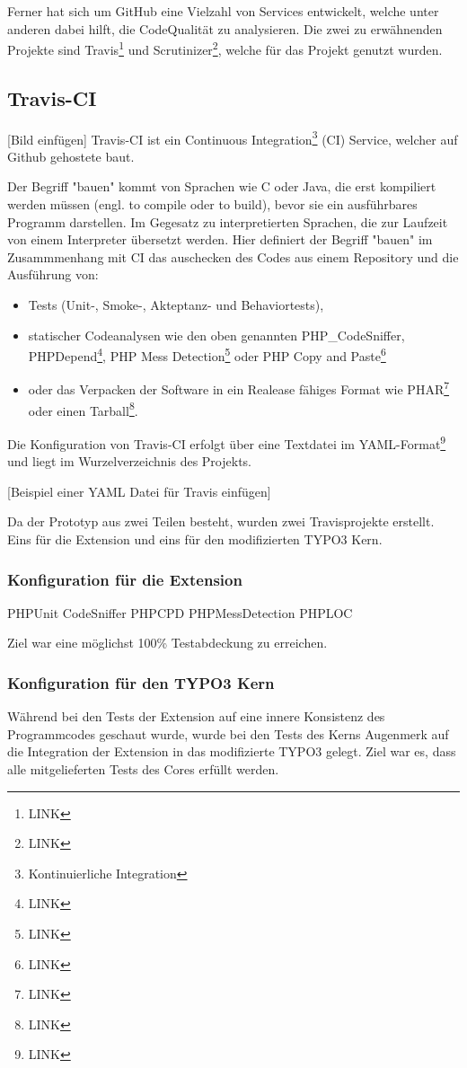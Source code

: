 Ferner hat sich um GitHub eine Vielzahl von Services entwickelt, welche unter anderen dabei hilft, die CodeQualität zu analysieren. Die zwei zu erwähnenden Projekte sind Travis\footnote{LINK} und Scrutinizer\footnote{LINK}, welche für das Projekt genutzt wurden.

\subsection{Travis-CI}
[Bild einfügen]
Travis-CI ist ein Continuous Integration\footnote{Kontinuierliche Integration} (CI) Service, welcher auf Github gehostete baut.

Der Begriff "bauen" kommt von Sprachen wie C oder Java, die erst kompiliert werden müssen (engl. to compile oder to build), bevor sie ein ausführbares Programm darstellen. Im Gegesatz zu interpretierten Sprachen, die zur Laufzeit von einem Interpreter übersetzt werden. Hier definiert der Begriff "bauen" im Zusammmenhang mit CI das auschecken des Codes aus einem Repository und die Ausführung von:
	\begin{itemize}
		\item Tests (Unit-, Smoke-, Akteptanz- und Behaviortests),
		\item statischer Codeanalysen wie den oben genannten PHP\_CodeSniffer, PHPDepend\footnote{LINK}, PHP Mess Detection\footnote{LINK} oder PHP Copy and Paste\footnote{LINK}
		\item oder das Verpacken der Software in ein Realease fähiges Format wie PHAR\footnote{LINK} oder einen Tarball\footnote{LINK}.
	\end{itemize}

Die Konfiguration von Travis-CI erfolgt über eine Textdatei im YAML-Format\footnote{LINK} und liegt im Wurzelverzeichnis des Projekts.

[Beispiel einer YAML Datei für Travis einfügen]

Da der Prototyp aus zwei Teilen besteht, wurden zwei Travisprojekte erstellt. Eins für die Extension und eins für den modifizierten TYPO3 Kern.

\subsubsection{Konfiguration für die Extension}
PHPUnit
CodeSniffer
PHPCPD
PHPMessDetection
PHPLOC

Ziel war eine möglichst 100\% Testabdeckung zu erreichen.

\subsubsection{Konfiguration für den TYPO3 Kern}
Während bei den Tests der Extension auf eine innere Konsistenz des Programmcodes geschaut wurde, wurde bei den Tests des Kerns Augenmerk auf die Integration der Extension in das modifizierte TYPO3 gelegt. Ziel war es, dass alle mitgelieferten Tests des Cores erfüllt werden.


